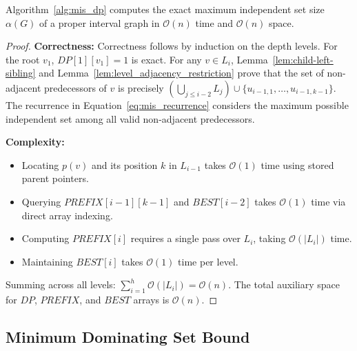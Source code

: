 \begin{theorem}
\label{thm:linear-mis}
Algorithm~\ref{alg:mis_dp} computes the exact maximum independent set size $\alpha(G)$ of a proper interval graph in $\mathcal{O}(n)$ time and $\mathcal{O}(n)$ space.
\end{theorem}
\begin{proof}
\textbf{Correctness:} Correctness follows by induction on the depth levels. For the root $v_1$, $DP[1][v_1] = 1$ is exact. For any $v \in L_i$, Lemma~\ref{lem:child-left-sibling} and Lemma~\ref{lem:level_adjacency_restriction} prove that the set of non-adjacent predecessors of $v$ is precisely $(\bigcup_{j \le i-2} L_j) \cup \{u_{i-1, 1}, \dots, u_{i-1, k-1}\}$. The recurrence in Equation~\eqref{eq:mis_recurrence} considers the maximum possible independent set among all valid non-adjacent predecessors.

\textbf{Complexity:} 
\begin{itemize}
    \item Locating $p(v)$ and its position $k$ in $L_{i-1}$ takes $\mathcal{O}(1)$ time using stored parent pointers.
    \item Querying $PREFIX[i-1][k-1]$ and $BEST[i-2]$ takes $\mathcal{O}(1)$ time via direct array indexing.
    \item Computing $PREFIX[i]$ requires a single pass over $L_i$, taking $\mathcal{O}(|L_i|)$ time.
    \item Maintaining $BEST[i]$ takes $\mathcal{O}(1)$ time per level.
\end{itemize}
Summing across all levels: $\sum_{i=1}^h \mathcal{O}(|L_i|) = \mathcal{O}(n)$. The total auxiliary space for $DP$, $PREFIX$, and $BEST$ arrays is $\mathcal{O}(n)$.
\end{proof}

\subsection{Minimum Dominating Set Bound}

